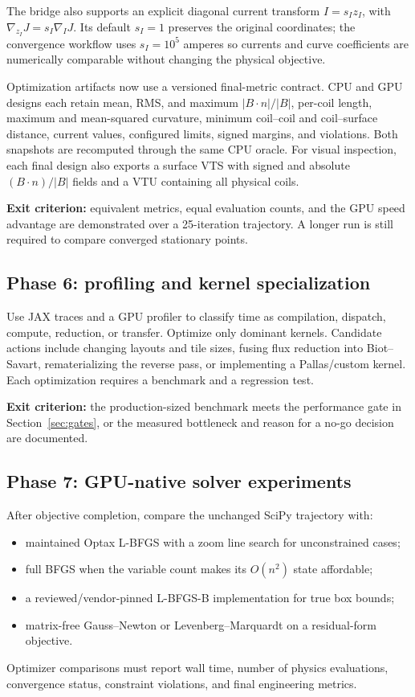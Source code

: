 \documentclass[11pt,a4paper]{article}
\begin{document}
The bridge also supports an explicit diagonal current transform
$I=s_I z_I$, with $\nabla_{z_I}J=s_I\nabla_IJ$.  Its default $s_I=1$ preserves
the original coordinates; the convergence workflow uses $s_I=10^5$ amperes so
currents and curve coefficients are numerically comparable without changing the
physical objective.

Optimization artifacts now use a versioned final-metric contract.  CPU and GPU
designs each retain mean, RMS, and maximum $|B\cdot n|/|B|$, per-coil length,
maximum and mean-squared curvature, minimum coil--coil and coil--surface
distance, current values, configured limits, signed margins, and violations.
Both snapshots are recomputed through the same CPU oracle.
For visual inspection, each final design also exports a surface VTS with signed
and absolute $(B\cdot n)/|B|$ fields and a VTU containing all physical coils.

\textbf{Exit criterion:} equivalent metrics, equal evaluation counts, and the
GPU speed advantage are demonstrated over a 25-iteration trajectory.  A longer
run is still required to compare converged stationary points.

\subsection{Phase 6: profiling and kernel specialization}

Use JAX traces and a GPU profiler to classify time as compilation, dispatch,
compute, reduction, or transfer.  Optimize only dominant kernels.  Candidate
actions include changing layouts and tile sizes, fusing flux reduction into
Biot--Savart, rematerializing the reverse pass, or implementing a Pallas/custom
kernel.  Each optimization requires a benchmark and a regression test.

\textbf{Exit criterion:} the production-sized benchmark meets the performance
gate in Section~\ref{sec:gates}, or the measured bottleneck and reason for a
no-go decision are documented.

\subsection{Phase 7: GPU-native solver experiments}

After objective completion, compare the unchanged SciPy trajectory with:
\begin{itemize}
  \item maintained Optax L-BFGS with a zoom line search for unconstrained cases;
  \item full BFGS when the variable count makes its $O(n^2)$ state affordable;
  \item a reviewed/vendor-pinned L-BFGS-B implementation for true box bounds;
  \item matrix-free Gauss--Newton or Levenberg--Marquardt on a residual-form
        objective.
\end{itemize}
Optimizer comparisons must report wall time, number of physics evaluations,
convergence status, constraint violations, and final engineering metrics.
\end{document}
